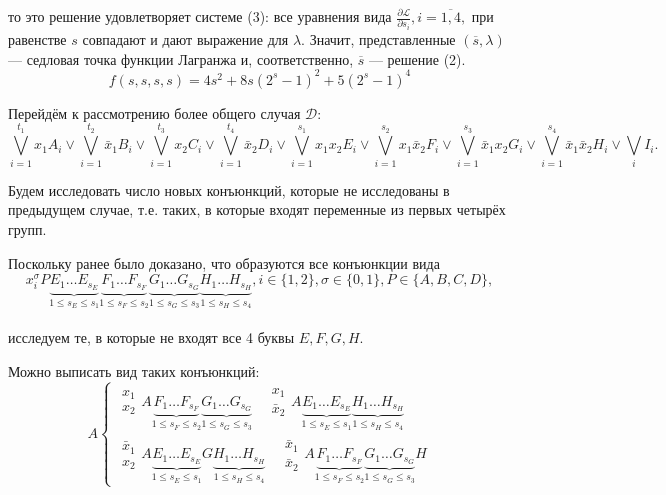 \documentclass[12pt,a4paper,oneside,fleqn,leqno]{article}
\theoremstyle{definition}
\begin{document}
			то это решение удовлетворяет системе (3): все уравнения вида $\frac{\partial\mathcal{L}}{\partial s_i},i=\overline{1,4},$ при равенстве $s$ совпадают и дают выражение для $\lambda$. Значит, представленные $(\overline{s}, \lambda)$ --- седловая точка функции Лагранжа и, соответственно, $\overline{s}$ --- решение (2).
			$$
				f(s,s,s,s) = 4s^2 + 8s(2^s - 1)^2 + 5(2^s - 1)^4
			$$\par
			Перейдём к рассмотрению более общего случая $\mathcal{D}:$
			$$
				\bigvee_{i = 1}^{t_1}x_1A_i \vee \bigvee_{i = 1}^{t_2}\bar{x}_1B_i \vee \bigvee_{i = 1}^{t_3}x_2C_i \vee \bigvee_{i = 1}^{t_4}\bar{x}_2D_i \vee \bigvee_{i = 1}^{s_1}x_1x_2E_i \vee \bigvee_{i = 1}^{s_2}x_1\bar{x}_2F_i \vee \bigvee_{i = 1}^{s_3}\bar{x}_1x_2G_i \vee \bigvee_{i = 1}^{s_4}\bar{x}_1\bar{x}_2H_i \vee \bigvee_iI_i.
			$$\par
			Будем исследовать число новых конъюнкций, которые не исследованы в предыдущем случае, т.е. таких, в которые входят переменные из первых четырёх групп.\par
			Поскольку ранее было доказано, что образуются все конъюнкции вида
			$$%
				x_i^{\sigma} P \underbrace{E_1\ldots E_{s_E}}_{1\leqslant s_E \leqslant s_1}\underbrace{F_1\ldots F_{s_F}}_{1\leqslant s_F \leqslant s_2}\underbrace{G_1\ldots G_{s_G}}_{1\leqslant s_G \leqslant s_3}\underbrace{H_1\ldots H_{s_H}}_{1\leqslant s_H \leqslant s_4}, i\in\{1,2\},\sigma\in\{0,1\}, P \in \{A, B, C, D\},
			$$\\%
			исследуем те, в которые не входят все 4 буквы $E, F, G, H.$\par
			Можно выписать вид таких конъюнкций:
			$$
			A\begin{cases}
\begin{matrix}x_1\\x_2\end{matrix} A\underbrace{F_1\ldots F_{s_F}}_{1 \leqslant s_F \leqslant s_2}\underbrace{G_1\ldots G_{s_G}}_{1 \leqslant s_G \leqslant s_3} \quad
 \begin{matrix}x_1\\\bar{x}_2\end{matrix} A\underbrace{E_1\ldots E_{s_E}}_{1 \leqslant s_E \leqslant s_1}\underbrace{H_1\ldots H_{s_H}}_{1 \leqslant s_H \leqslant s_4} \\
 \begin{matrix}\bar{x}_1\\x_2\end{matrix} A\underbrace{E_1\ldots E_{s_E}}_{1 \leqslant s_E \leqslant s_1}G\underbrace{H_1\ldots H_{s_H}}_{1 \leqslant s_H \leqslant s_4} \quad
\begin{matrix}\bar{x}_1\\\bar{x}_2\end{matrix} A\underbrace{F_1\ldots F_{s_F}}_{1 \leqslant s_F \leqslant s_2}\underbrace{G_1\ldots G_{s_G}}_{1 \leqslant s_G \leqslant s_3}H
			\end{cases}
			$$
\end{document}
